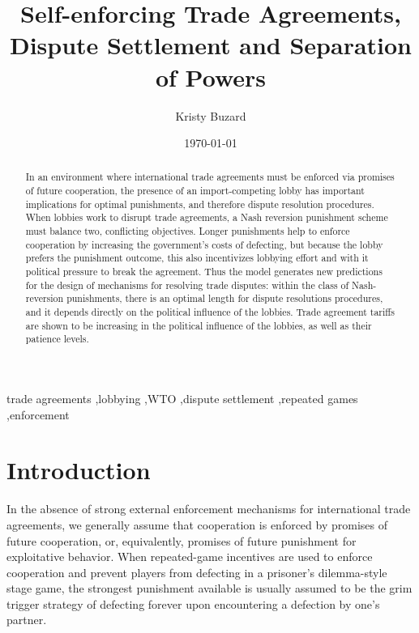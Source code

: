 \documentclass[authoryear, review]{elsarticle}
\begin{document}
\title{Self-enforcing Trade Agreements, Dispute Settlement and Separation of Powers}
\author{Kristy Buzard}
\address{110 Eggers Hall, Economics Department, Syracuse University, Syracuse, NY 13244. 315-443-4079.}
\date{\today}

\begin{abstract}
In an environment where international trade agreements must be enforced via promises of future cooperation, the presence of an import-competing lobby has important implications for optimal punishments, and therefore dispute resolution procedures. When lobbies work to disrupt trade agreements, a Nash reversion punishment scheme must balance two, conflicting objectives. Longer punishments help to enforce cooperation by increasing the government's costs of defecting, but because the lobby prefers the punishment outcome, this also incentivizes lobbying effort and with it political pressure to break the agreement. Thus the model generates new predictions for the design of mechanisms for resolving trade disputes: within the class of Nash-reversion punishments, there is an optimal length for dispute resolutions procedures, and it depends directly on the political influence of the lobbies. Trade agreement tariffs are shown to be increasing in the political influence of the lobbies, as well as their patience levels.
\end{abstract}

\begin{keyword}

trade agreements \sep lobbying \sep WTO \sep dispute settlement \sep repeated games \sep enforcement

\end{keyword}

\maketitle

\section{Introduction}
\label{sec:intro}
In the absence of strong external enforcement mechanisms for international trade agreements, we generally assume that cooperation is enforced by promises of future cooperation, or, equivalently, promises of future punishment for exploitative behavior. When repeated-game incentives are used to enforce cooperation and prevent players from defecting in a prisoner's dilemma-style stage game, the strongest punishment available is usually assumed to be the grim trigger strategy of defecting forever upon encountering a defection by one's partner.
\end{document}
